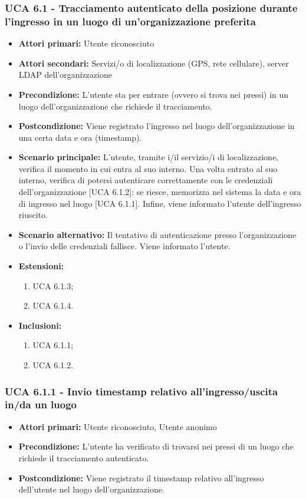 \subsubsection{UCA 6.1 - Tracciamento autenticato della posizione durante l'ingresso in un luogo di un'organizzazione preferita}
\begin{itemize}
	\item \textbf{Attori primari:} Utente riconosciuto
	\item \textbf{Attori secondari:} Servizi/o di localizzazione (GPS, rete cellulare), server LDAP dell'organizzazione
	\item \textbf{Precondizione:} L'utente sta per entrare (ovvero si trova nei pressi) in un luogo dell'organizzazione che richiede il tracciamento.
	\item \textbf{Postcondizione:} Viene registrato l'ingresso nel luogo dell'organizzazione in una certa data e ora (timestamp).
	\item \textbf{Scenario principale:} L'utente, tramite i/il servizio/i di localizzazione, verifica il momento in cui entra al suo interno. Una volta entrato al suo interno, verifica di potersi autenticare correttamente con le credenziali dell'organizzazione [UCA 6.1.2]: se riesce, memorizza nel sistema la data e ora di ingresso nel luogo [UCA 6.1.1]. Infine, viene informato l'utente dell'ingresso riuscito.
	\item \textbf{Scenario alternativo:} Il tentativo di autenticazione presso l'organizzazione o l'invio delle credenziali fallisce. Viene informato l'utente.
	\item \textbf{Estensioni:}
	\begin{enumerate}
		\item UCA 6.1.3;
		\item UCA 6.1.4.
	\end{enumerate}
	\item \textbf{Inclusioni:}
	\begin{enumerate}
		\item UCA 6.1.1;
		\item UCA 6.1.2.
	\end{enumerate}
\end{itemize}

\subsubsection{UCA 6.1.1 - Invio timestamp relativo all'ingresso/uscita in/da un luogo}
\begin{itemize}
	\item \textbf{Attori primari:} Utente riconosciuto, Utente anonimo
	\item \textbf{Precondizione:} L'utente ha verificato di trovarsi nei pressi di un luogo che richiede il tracciamento autenticato.
	\item \textbf{Postcondizione:} Viene registrato il timestamp relativo all'ingresso dell'utente nel luogo dell'organizzazione.
\end{itemize}

